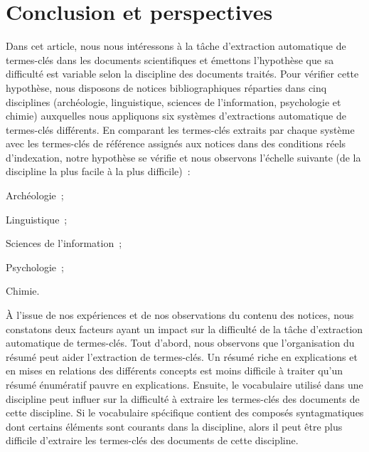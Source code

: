 \section{Conclusion et perspectives}
\label{sec:conclusion_et_perspectives}
  Dans cet article, nous nous intéressons à la tâche d'extraction automatique de
  termes-clés dans les documents scientifiques et émettons l'hypothèse que sa
  difficulté est variable selon la discipline des documents traités. Pour
  vérifier cette hypothèse, nous disposons de notices bibliographiques réparties
  dans cinq disciplines (archéologie, linguistique, sciences de l'information,
  psychologie et chimie) auxquelles nous appliquons six systèmes d'extractions
  automatique de termes-clés différents. En comparant les termes-clés extraits
  par chaque système avec les termes-clés de référence assignés aux notices dans
  des conditions réels d'indexation, notre hypothèse se vérifie et nous
  observons l'échelle suivante (de la discipline la plus facile à la plus
  difficile)~:
  \begin{enumerate*}
    \item{Archéologie~;}
    \item{Linguistique~;}
    \item{Sciences de l'information~;}
    \item{Psychologie~;}
    \item{Chimie.}
  \end{enumerate*}

  À l'issue de nos expériences et de nos observations du contenu des notices,
  nous constatons deux facteurs ayant un impact sur la difficulté de la tâche
  d'extraction automatique de termes-clés. Tout d'abord, nous observons que
  l'organisation du résumé peut aider l'extraction de termes-clés. Un résumé
  riche en explications et en mises en relations des différents concepts est
  moins difficile à traiter qu'un résumé énumératif pauvre en explications.
  Ensuite, le vocabulaire utilisé dans une discipline peut influer sur la
  difficulté à extraire les termes-clés des documents de cette discipline. Si le
  vocabulaire spécifique contient des composés syntagmatiques dont certains
  éléments sont courants dans la discipline, alors il peut être plus difficile
  d'extraire les termes-clés des documents de cette discipline.

